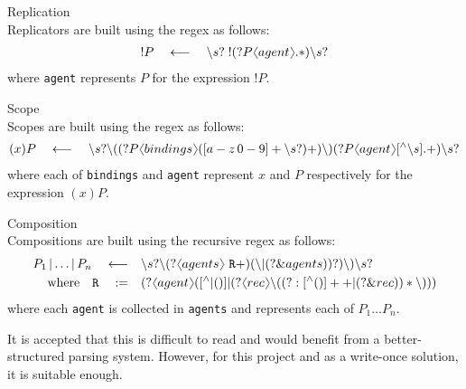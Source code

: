         \begin{definition}{Replication\\}
            Replicators are built using the regex as follows:
            \begin{align*}
                ! P \quad \longleftarrow \quad \backslash s? \; !(?P \langl agent \rangl.*)\backslash s?
            \end{align*}
            where \texttt{agent} represents $P$ for the expression $!P$.
        \end{definition}

        \begin{definition}{Scope\\}
            Scopes are built using the regex as follows:
            \begin{align*}
                (x)P \quad \longleftarrow \quad \backslash s? \backslash ((?P \langl bindings \rangl([a-z \, 0-9]+ \backslash s?)+)\backslash )(?P\langl agent \rangl[^{\wedge}\backslash s].+)\backslash s?
            \end{align*}
            where each of \texttt{bindings} and \texttt{agent} represent $x$ and $P$ respectively for the expression $(x) P$.
        \end{definition}

        \begin{definition}{Composition\\}
            Compositions are built using the recursive regex as follows:
            \begin{align*}
                P_1 \, | \ldots | \, P_n \quad \longleftarrow \quad & \backslash s? \backslash (?\langl agents\rangl~\texttt{R}+) (\backslash | (?\&agents))?)\backslash )\backslash s? \\
                \text{where} \quad \texttt{R} \quad \defeq \quad & (?\langl agent\rangl([^{\wedge}|()] | (?\langl rec\rangl\backslash ((?:[^{\wedge}()]++|(?\&rec))*\backslash )))
            \end{align*}
            where each \texttt{agent} is collected in \texttt{agents} and represents each of $P_1 \ldots P_n$.
        \end{definition}
        It is accepted that this is difficult to read and would benefit from a better-structured parsing system.
        However, for this project and as a write-once solution, it is suitable enough.


